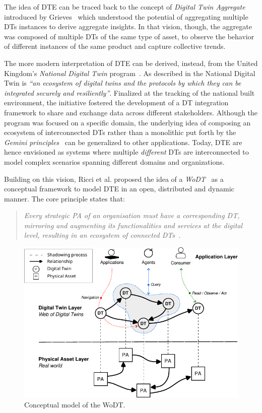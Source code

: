 The idea of \ac{DTE} can be traced back to the concept of \emph{Digital Twin Aggregate} introduced by Grieves~\cite{Grieves_2023} which understood the potential of aggregating multiple \acp{DT} instances to derive aggregate insights.
%
In that vision, though, the aggregate was composed of multiple \acp{DT} of the same type of asset, to observe the behavior of different instances of the same product and capture collective trends.

The more modern interpretation of \ac{DTE} can be derived, instead, from the United Kingdom's \textit{National Digital Twin} program~\cite{bulter2018geminiprinciples}.
%
As described in \cite{kendall2021ndt} the National Digital Twin is \emph{``an ecosystem
of digital twins and the protocols by which
they can be integrated securely and
resiliently''}.
%
Finalized at the tracking of the national built environment, the initiative fostered the development of a \ac{DT} integration framework to share and exchange data across different stakeholders.
%
Although the program was focused on a specific domain, the underlying idea of composing an ecosystem of interconnected \acp{DT} rather than a monolithic put forth by the \emph{Gemini principles}~\cite{bulter2018geminiprinciples} can be generalized to other applications.
%
Today, \ac{DTE} are hence envisioned as systems where multiple \emph{different} \acp{DT} are interconnected to model complex scenarios spanning different domains and organizations.

Building on this vision, Ricci et al. proposed the idea of a \emph{\ac{WoDT}}~\cite{web-of-dt-ricci-2022} as a conceptual framework to model \ac{DTE} in an open, distributed and dynamic manner.
The core principle states that:
%
\begin{quote}
\emph{
Every strategic \acl{PA} of an organisation must have a corresponding \acl{DT}, mirroring and augmenting its functionalities and services at the digital level, resulting in an ecosystem of connected \aclp{DT}~\cite{web-of-dt-ricci-2022}.
}
\end{quote}

\begin{figure}[t]
    \centering
    \includegraphics[width=\textwidth]{figures/wodt.pdf}
    \caption{Conceptual model of the \acl{WoDT}.}
    \label{fig:dt-wodt-model}
\end{figure}

